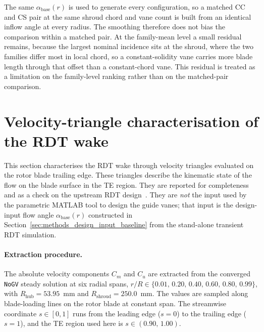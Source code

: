 The same $\alpha_{\mathrm{base}}(r)$ is used to generate every configuration, so a matched CC and CS pair at the same shroud chord and vane count is built from an identical inflow angle at every radius. The smoothing therefore does not bias the comparison within a matched pair. At the family-mean level a small residual remains, because the largest nominal incidence sits at the shroud, where the two families differ most in local chord, so a constant-solidity vane carries more blade length through that offset than a constant-chord vane. This residual is treated as a limitation on the family-level ranking rather than on the matched-pair comparison.

\section{Velocity-triangle characterisation of the RDT wake}
\label{sec:methods_rdt_velocity_triangles}
 
This section characterises the RDT wake through velocity triangles evaluated on the rotor blade trailing edge. These triangles describe the kinematic state of the flow on the blade surface in the TE region. They are reported for completeness and as a check on the upstream RDT design~\cite{DjupeslandTrivedi2025}. They are \emph{not} the input used by the parametric MATLAB tool to design the guide vanes; that input is the design-input flow angle $\alpha_{\mathrm{base}}(r)$ constructed in Section~\ref{sec:methods_design_input_baseline} from the stand-alone transient RDT simulation.
 
\paragraph{Extraction procedure.}
The absolute velocity components $C_m$ and $C_u$ are extracted from the converged \texttt{NoGV} steady solution at six radial spans, $r/R \in \{0.01,\,0.20,\,0.40,\,0.60,\,0.80,\,0.99\}$, with $R_{\mathrm{hub}}=53.95$~mm and $R_{\mathrm{shroud}}=250.0$~mm. The values are sampled along blade-loading lines on the rotor blade at constant span. The streamwise coordinate $s\in[0,1]$ runs from the leading edge ($s=0$) to the trailing edge ($s=1$), and the TE region used here is $s\in(0.90,\,1.00)$.
 
